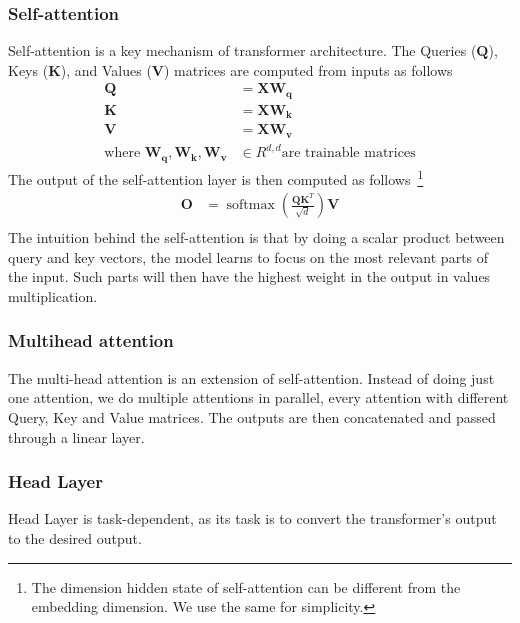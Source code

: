 \subsubsection{Self-attention}
Self-attention is a key mechanism of transformer architecture.
The Queries ($\mathbf{Q}$), Keys ($\mathbf{K}$), and Values ($\mathbf{V}$) matrices are computed from inputs as follows
\begin{align*}
    \mathbf{Q}                                             & = \mathbf{X} \mathbf{W_q}                  \\
    \mathbf{K}                                             & = \mathbf{X} \mathbf{W_k}                  \\
    \mathbf{V}                                             & = \mathbf{X} \mathbf{W_v}                  \\
    \text{where } \mathbf{W_q}, \mathbf{W_k}, \mathbf{W_v} & \in R^{d, d} \text{are trainable matrices}
\end{align*}
The output of the self-attention layer is then computed as follows~\footnote{The dimension hidden state of self-attention can be different from the embedding dimension. We use the same for simplicity.}
\begin{align*}
    \mathbf{O} & = \operatorname{softmax}\left(\frac{\mathbf{Q} \mathbf{K}^T}{\sqrt{d}}\right) \mathbf{V} \\
    \label{eq:attention}
\end{align*}
The intuition behind the self-attention is that by doing a scalar product between query and key vectors,
the model learns to focus on the most relevant parts of the input.
Such parts will then have the highest weight in the output in values multiplication.

\subsubsection{Multihead attention}
The multi-head attention is an extension of self-attention.
Instead of doing just one attention, we do multiple attentions in parallel, every attention with different Query, Key and Value matrices.
The outputs are then concatenated and passed through a linear layer.

\subsubsection{Head Layer}
Head Layer is task-dependent, as its task is to convert the transformer's output to the desired output.


